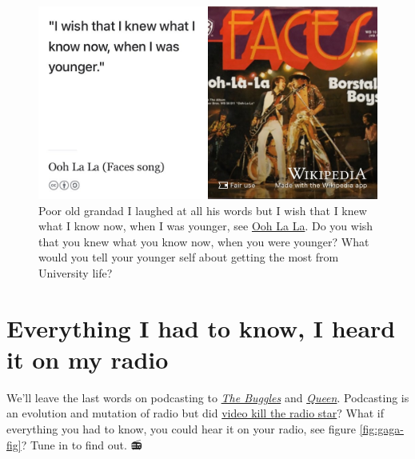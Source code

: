 \documentclass[
]{book}
\begin{document}
\begin{figure}

{\centering \includegraphics[width=0.99\linewidth]{images/faces} 

}

\caption{Poor old grandad I laughed at all his words but I wish that I knew what I know now, when I was younger, see \href{https://en.wikipedia.org/wiki/Ooh_La_La_(Faces_song)}{Ooh La La}. \citep{faces} Do you wish that you knew what you know now, when you were younger? What would you tell your younger self about getting the most from University life?}\label{fig:faces2-fig}
\end{figure}



\hypertarget{radio}{%
\section{Everything I had to know, I heard it on my radio}\label{radio}}

We'll leave the last words on podcasting to \emph{\href{https://en.wikipedia.org/wiki/The_Buggles}{The Buggles}} and \emph{\href{https://en.wikipedia.org/wiki/Queen_(band)}{Queen}}. Podcasting is an evolution and mutation of radio but did \href{https://en.wikipedia.org/wiki/Video_Killed_the_Radio_Star}{video kill the radio star}? \citep{videokilled} What if everything you had to know, you could hear it on your radio, see figure \ref{fig:gaga-fig}? Tune in to find out. 📻
\end{document}
